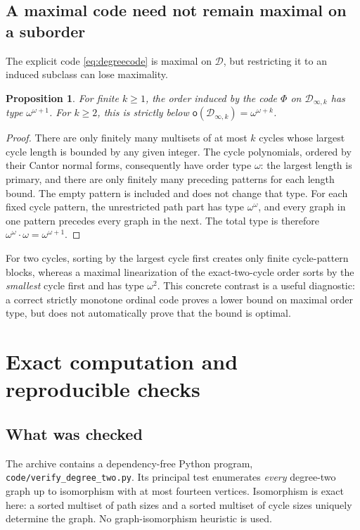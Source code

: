 \documentclass[11pt,letterpaper]{article}
\theoremstyle{plain}
\newtheorem{proposition}[proposition]{Proposition}
\theoremstyle{definition}
\theoremstyle{remark}
\newcommand{\mot}{\mathsf o}
\newcommand{\DG}{\mathcal D}
\newcommand{\Inf}{\infty}
\begin{document}
\subsection{A maximal code need not remain maximal on a suborder}

The explicit code \cref{eq:degreecode} is maximal on $\DG$, but
restricting it to an induced subclass can lose maximality.

\begin{proposition}\label{prop:nonmaxcode}
For finite $k\ge1$, the order induced by the code $\Phi$ on
$\DG_{\Inf,k}$ has type $\omega^{\omega+1}$. For $k\ge2$, this is
strictly below $\mot(\DG_{\Inf,k})=\omega^{\omega+k}$.
\end{proposition}

\begin{proof}
There are only finitely many multisets of at most $k$ cycles whose
largest cycle length is bounded by any given integer. The cycle
polynomials, ordered by their Cantor normal forms, consequently
have order type $\omega$: the largest length is primary, and there
are only finitely many preceding patterns for each length bound.
The empty pattern is included and does not change that type.
For each fixed cycle pattern, the unrestricted path part has type
$\omega^\omega$, and every graph in one pattern precedes every graph
in the next. The total type is therefore
$\omega^\omega\cdot\omega=\omega^{\omega+1}$.
\end{proof}

For two cycles, sorting by the largest cycle first creates only
finite cycle-pattern blocks, whereas a maximal linearization of the
exact-two-cycle order sorts by the \emph{smallest} cycle first and
has type $\omega^2$. This concrete contrast is a useful diagnostic:
a correct strictly monotone ordinal code proves a lower bound on
maximal order type, but does not automatically prove that the bound
is optimal.

\section{Exact computation and reproducible checks}\label{sec:computation}

\subsection{What was checked}

The archive contains a dependency-free Python program,
\texttt{code/verify\_degree\_two.py}. Its principal test enumerates
\emph{every} degree-two graph up to isomorphism with at most fourteen
vertices. Isomorphism is exact here: a sorted multiset of path sizes
and a sorted multiset of cycle sizes uniquely determine the graph.
No graph-isomorphism heuristic is used.
\end{document}
